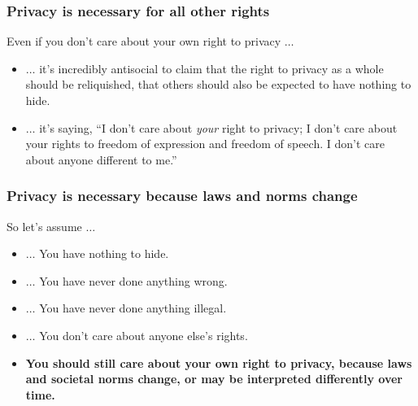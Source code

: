 \begin{frame}
  \frametitle{Privacy is necessary for all other rights}

  \begin{block}{Even if you don't care about your own right to privacy $\dots$}
  \begin{itemize}
    \item<1-> $\dots$ it's incredibly antisocial to claim that the right to privacy as
      a whole should be reliquished, that others should also be expected to have
      nothing to hide.
    \item<2-> $\dots$ it's saying, ``I don't care about \emph{your} right to
      privacy; I don't care about your rights to freedom of expression and
      freedom of speech. I don't care about anyone different to me.''
  \end{itemize}
  \end{block}

\end{frame}


\begin{frame}
  \frametitle{Privacy is necessary because laws and norms change}

  \begin{block}{So let's assume $\dots$}
  \begin{itemize}
    \item $\dots$ You have nothing to hide.
    \item<2-> $\dots$ You have never done anything wrong.
    \item<3-> $\dots$ You have never done anything illegal.
    \item<4-> $\dots$ You don't care about anyone else's rights.
    \item<5-> \textbf{You should still care about your own right to privacy,
      because laws and societal norms change, or may be interpreted
      differently over time.}
  \end{itemize}
  \end{block}

\end{frame}


